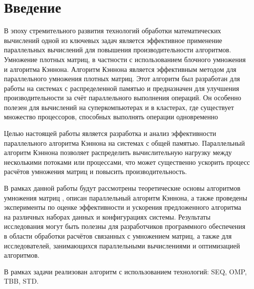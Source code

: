 \documentclass{report}
\begin{document}
\setcounter{page}{2}

\tableofcontents
\newpage

\section*{Введение}
\par В эпоху стремительного развития технологий обработки математических вычислений одной из ключевых задач является эффективное применение параллельных вычислений для повышения производительности алгоритмов. Умножение плотных матриц, в частности с использованием блочного умножения и алгоритма Кэннона. Алгоритм Кэннона является эффективным методом для параллельного умножения плотных матриц. Этот алгоритм был разработан для работы на системах с распределенной памятью и предназначен для улучшения производительности за счёт параллельного выполнения операций. Он особенно полезен для вычислений на суперкомпьютерах и в кластерах, где существует множество процессоров, способных выполнять операции одновременно

\par Целью настоящей работы является разработка и анализ эффективности параллельного алгоритма Кэннона на системах с общей памятью. Параллельный алгоритм Кэннона позволяет распределить вычислительную нагрузку между несколькими потоками или процессами, что может существенно ускорить процесс расчётов умножения матриц и повысить производительность.

\par В рамках данной работы будут рассмотрены теоретические основы алгоритмов умножения матриц , описан параллельный алгоритм Кэннона, а также проведены эксперименты по оценке эффективности и ускорения предложенного алгоритма на различных наборах данных и конфигурациях системы. Результаты исследования могут быть полезны для разработчиков программного обеспечения в области обработки расчётов связанных с умножением матриц, а также для исследователей, занимающихся параллельными вычислениями и оптимизацией алгоритмов.

\par В рамках задачи реализован алгоритм с использованием технологий: SEQ, OMP, TBB, STD.

\newpage

\end{document}
